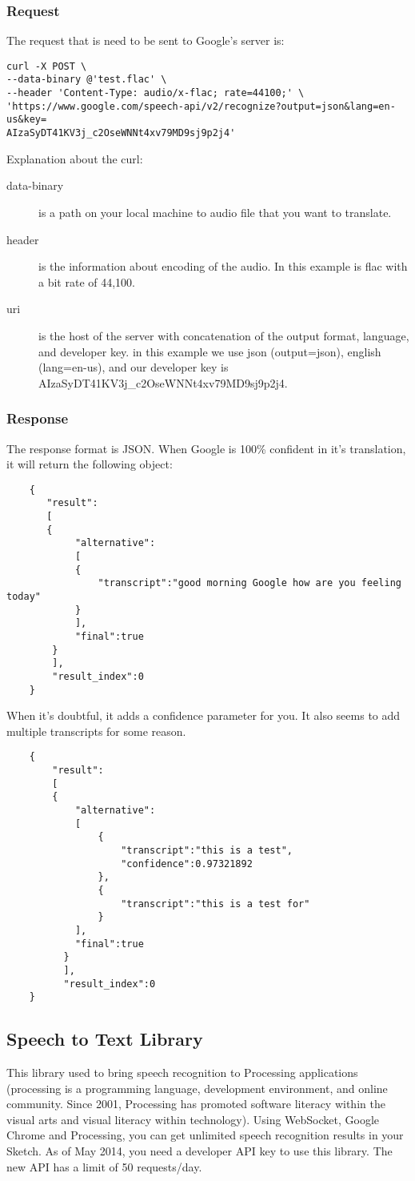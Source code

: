 \subsubsection{Request}
The request that is need to be sent to Google's server is:
\begin{lstlisting}
curl -X POST \
--data-binary @'test.flac' \
--header 'Content-Type: audio/x-flac; rate=44100;' \
'https://www.google.com/speech-api/v2/recognize?output=json&lang=en-us&key=
AIzaSyDT41KV3j_c2OseWNNt4xv79MD9sj9p2j4'
\end{lstlisting}
Explanation about the curl:
\begin{description}
	\item [data-binary] is a path on your local machine to audio file that you want to translate.
	\item [header] is the information about encoding of the audio. In this example is flac with a bit rate of 44,100.
	\item [uri] is the host of the server with concatenation of the output format, language, and developer key. in this example we use json (output=json), english (lang=en-us), and our developer key is AIzaSyDT41KV3j\_c2OseWNNt4xv79MD9sj9p2j4.
\end{description}
\subsubsection{Response}
The response format is JSON. When Google is 100\% confident in it's translation, it will return the following object:
\begin{lstlisting}
	{
	   "result":
	   [
	   {
	   		"alternative":
	   		[
	   		{
	   			"transcript":"good morning Google how are you feeling today"
	   		}
	   		],
	   		"final":true
	   	}
	   	],
	   	"result_index":0
	}
\end{lstlisting}
When it's doubtful, it adds a confidence parameter for you. It also seems to add multiple transcripts for some reason.
\begin{lstlisting}
	{
		"result":
		[
		{
			"alternative":
			[
				{
					"transcript":"this is a test",
					"confidence":0.97321892
		        },
		        {
		        	"transcript":"this is a test for"
		        }
	      	],
	      	"final":true
	      }
	      ],
	      "result_index":0
	}
\end{lstlisting}
\subsection{Speech to Text Library}
This library used to bring speech recognition to Processing applications (processing is a programming language, development environment, and online community. Since 2001, Processing has promoted software literacy within the visual arts and visual literacy within technology). Using WebSocket, Google Chrome and Processing, you can get unlimited speech recognition results in your Sketch. As of May 2014, you need a developer API key to use this library. The new API has a limit of 50 requests/day.

